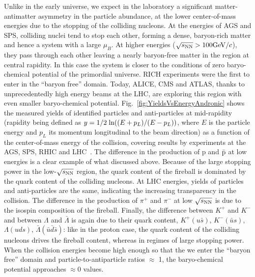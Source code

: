 Unlike in the early universe, we expect in the laboratory a significant matter-antimatter 
asymmetry in the particle abundance, at the lower center-of-mass energies due to the
stopping of the colliding nucleons. 
At the energies of AGS and SPS, colliding nuclei tend to stop each other, forming a 
dense, baryon-rich matter and hence a system with a large $\mu_{B}$. At higher 
energies ($\sqrt{s_{\rm NN}} > 100 \mathrm{GeV}/c$), they pass through each other leaving a nearly 
baryon-free matter in the region at central rapidity. In this case the system is closer 
to the conditions of zero baryo-chemical potential of the primordial universe. 
RICH experiments were the first to enter in the  ``baryon free'' domain. Today, ALICE, 
CMS and ATLAS, thanks to unprecedentedly high energy beams at the LHC, are 
exploring this region with even smaller baryo-chemical potential. 
Fig.~\ref{fig:YieldsVsEnergyAndronic} shows the measured yields of identified 
particles and anti-particles at mid-rapidity (rapidity being defined as 
\mbox{$y = 1/2 \; {\rm ln}((E+p_{L})/(E-p_{L}))$}, where $E$ is the particle energy 
and $p_{L}$ its momentum longitudinal to the beam direction) as a function of the 
center-of-mass energy of the collision, covering results by experiments at the 
AGS, SPS, RHIC and LHC~\cite{Andronic:2014zha}. The difference in the production 
of p and $\bar{\rm p}$ at low energies is a clear example of what discussed above. 
Because of the large stopping power in the low-$\sqrt{s_{\rm NN}}$ region, the quark content of
 the fireball is dominated by the quark content of the colliding nucleons. At LHC 
 energies, yields of particles and anti-particles are the same, 
 indicating the increasing transparency in the collision. 
The difference in the production of $\pi^+$ and $\pi^-$ at low $\sqrt{s_{\rm NN}}$ is due to the 
isospin composition of the fireball. Finally, the difference between $K^+$ and $K^-$ 
and between $\Lambda$ and $\bar{\Lambda}$ is again due to their quark content, 
$K^+ (u\bar{s})$, $K^- (\bar{u}s)$, $\Lambda (uds)$, $\bar{\Lambda} (\bar
{u}\bar{d}\bar{s})$: like in the proton case, the quark content of the colliding nucleons
drives the fireball content, whereas in regimes of large stopping power. When the collision energies become 
high enough so that the we enter the ``baryon free'' domain and particle-to-antiparticle ratios $\approx$ 1,
the baryo-chemical potential approaches $\approx 0$ values.


